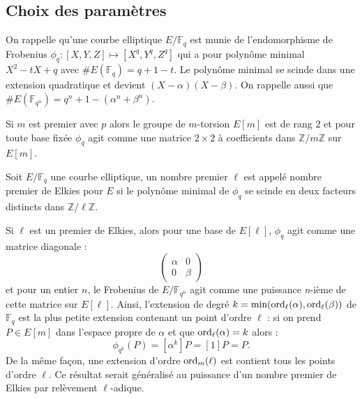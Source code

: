 \documentclass[a4paper]{article} %
\numberwithin{section}{part}
\numberwithin{equation}{section}
\newcommand\nroot[1]{\textit{#1}-ième}
\newcommand\zmodn[1]{\mathbb{Z}/#1\mathbb{Z}}
\newcommand\GF[1]{\mathbb{F}_{#1}}
\newcommand\ord[2]{\textup{ord}_{#1}(#2)}
\begin{document}
\subsection{Choix des paramètres}
\label{sec:choixparam}
On rappelle qu'une courbe elliptique $E/\GF{q}$ est munie de l'endomorphisme de
Frobenius $\phi_q : [X, Y, Z] \mapsto [X^q, Y^q, Z^q]$ qui a pour polynôme
minimal $X^2 -tX + q$ avec $\#E(\GF{q}) = q + 1 - t$. Le polynôme
minimal se scinde dans une extension quadratique et devient $(X -
\alpha)(X - \beta)$. On rappelle aussi que $\#E(\GF{q^n}) = q^n + 1 - (\alpha^n
+ \beta^n)$.\par
Si $m$ est premier avec $p$ alors le groupe de $m$-torsion $E[m]$ est de rang
$2$ et pour toute base fixée $\phi_q$ agit comme une matrice $2\times2$ à
coefficients dans $\zmodn{m}$ sur $E[m]$.
\begin{defn}
Soit $E/\GF{q}$ une courbe elliptique, un nombre premier $\ell$ est appelé
nombre premier de Elkies pour $E$ si le polynôme minimal de $\phi_q$ se scinde
en deux facteurs distincts dans $\zmodn{\ell}$.
\end{defn}
Si $\ell$ est un premier de Elkies, alors pour une base de $E[\ell]$, $\phi_q$
agit comme une matrice diagonale :
\begin{equation}
\begin{pmatrix}
\alpha & 0\\
0 & \beta
\end{pmatrix}
\end{equation}
et pour un entier $n$, le Frobenius de $E/\GF{q^n}$ agit comme une puissance
\nroot{n} de cette matrice sur $E[\ell]$. Ainsi, l'extension de degré
$k = \textup{min}(\ord{\ell}{\alpha},\ord{\ell}{\beta})$ de 
$\GF{q}$ est la plus petite extension contenant un point d'ordre $\ell$ : si on
prend $P\in E[m]$ dans l'espace propre de $\alpha$  et que $\ord{\ell}{\alpha} =
k$ alors :
\begin{equation}
\phi_{q^k}(P) = [\alpha^k]P = [1]P = P.
\end{equation}
De la même façon, une extension d'ordre $\ord{m}{\ell}$ est contient tous les 
points d'ordre $\ell$. Ce résultat serait généralisé au puissance d'un nombre 
premier de Elkies par relèvement $\ell$-adique.\par 
\end{document}
